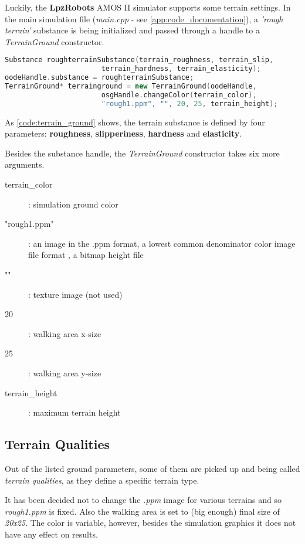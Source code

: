 Luckily, the \textbf{LpzRobots} AMOS II simulator supports some terrain settings. In the main simulation file (\textit{main.cpp} - see \ref{app:code_documentation}), a \textit{'rough terrain'} substance is being initialized and passed through a handle to a \textit{TerrainGround} constructor.

\begin{lstlisting}[language=C++, caption={Setting a terrain ground in main.cpp}, label=code:terrain_ground]
Substance roughterrainSubstance(terrain_roughness, terrain_slip,
                       terrain_hardness, terrain_elasticity);
oodeHandle.substance = roughterrainSubstance;
TerrainGround* terrainground = new TerrainGround(oodeHandle, 
                       osgHandle.changeColor(terrain_color),
                       "rough1.ppm", "", 20, 25, terrain_height);
\end{lstlisting}

As \cref{code:terrain_ground} shows, the terrain substance is defined by four parameters: \textbf{roughness}, \textbf{slipperiness}, \textbf{hardness} and \textbf{elasticity}.

Besides the substance handle, the \textit{TerrainGround} constructor takes six more arguments.

\begin{description}
\item[terrain\_color] : simulation ground color
\item["rough1.ppm"] : an image in the .ppm format, a lowest common denominator color image file format \citep{misc:ppm}, a bitmap height file
\item[""] : texture image (not used)
\item[20] : walking area x-size 
\item[25] : walking area y-size
\item[terrain\_height] : maximum terrain height
\end{description}

\subsection{Terrain Qualities} \label{ssec:terrain_qualities}
Out of the listed ground parameters, some of them are picked up and being called \textit{terrain qualities}, as they define a specific terrain type.

It has been decided not to change the \textit{.ppm} image for various terrains and so \textit{rough1.ppm} is fixed. Also the walking area is set to (big enough) final size of \textit{20x25}. The color is variable, however, besides the simulation graphics it does not have any effect on results. 

